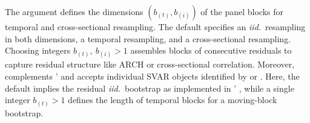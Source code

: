 The argument  defines the dimensions $ \left( b_{(t)}, b_{(i)} \right) $ of the panel blocks for temporal and cross-sectional resampling. The default  specifies an \textit{iid.}~resampling in both dimensions,  a temporal resampling, and  a cross-sectional resampling. Choosing integers $ b_{(t)}, \ b_{(i)} > 1 $ assembles blocks of consecutive residuals to capture residual structure like ARCH or cross-sectional correlation. Moreover,  complements '  \citep[Sec.~3.6 and 4.2]{LangeEtAl_fc} and accepts individual SVAR objects identified by  \citep{BreitungEtAl2004} or  \citep{JentschLunsford2021}. Here, the default  implies the residual \textit{iid.}~bootstrap as implemented in ' , while a single integer $ b_{(t)} > 1 $ defines the length of temporal blocks for a moving-block bootstrap.


